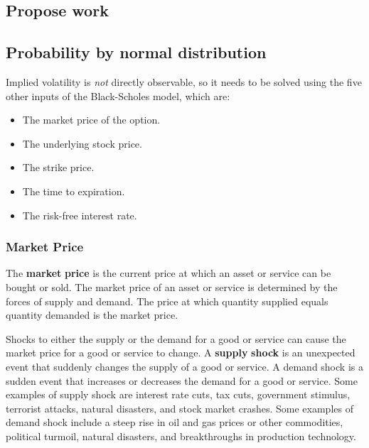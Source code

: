 \begin{multicols}{2}
\hypertarget{propose-work}{%
\section{Propose work}\label{propose-work}}

\hypertarget{probability-by-normal-distribution}{%
\subsection{Probability by normal
distribution}\label{probability-by-normal-distribution}}

Implied volatility is \emph{not} directly observable, so it needs to be
solved using the five other inputs of the Black-Scholes model, which
are:

\begin{itemize}
\tightlist
\item
  The market price of the option.
\item
  The underlying stock price.
\item
  The strike price.
\item
  The time to expiration.
\item
  The risk-free interest rate.
\end{itemize}

\hypertarget{market-price}{%
\subsubsection{Market Price}\label{market-price}}

The \textbf{market} \textbf{price} is the current price at which an
asset or service can be bought or sold. The market price of an asset or
service is determined by the forces of supply and demand. The price at
which quantity supplied equals quantity demanded is the market price.

Shocks to either the supply or the demand for a good or service can
cause the market price for a good or service to change. A
\textbf{supply} \textbf{shock} is an unexpected event that suddenly
changes the supply of a good or service. A demand shock is a sudden
event that increases or decreases the demand for a good or service. Some
examples of supply shock are interest rate cuts, tax cuts, government
stimulus, terrorist attacks, natural disasters, and stock market
crashes. Some examples of demand shock include a steep rise in oil and
gas prices or other commodities, political turmoil, natural disasters,
and breakthroughs in production technology.


\end{multicols}
